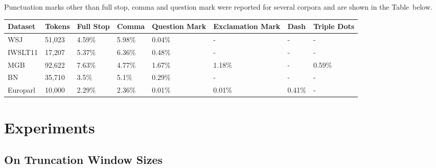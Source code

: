 \documentclass[bsc,deptreport,ai]{infthesis} %
\begin{document}
Punctuation marks other than full stop, comma and question mark were reported for several corpora and are shown in the Table~below.
\\
\vspace{1cm}
\begin{adjustbox}{width=\columnwidth,center}
\begin{tabular}{|l|lllllll|}
\hline
\textbf{Dataset} & \textbf{Tokens} & \textbf{Full Stop} & \textbf{Comma} & \textbf{Question Mark} & \textbf{Exclamation Mark} & \textbf{Dash} & \textbf{Triple Dots} \\ \hline
WSJ              & 51,023          & 4.59\%             & 5.98\%         & 0.04\%                 & -                         & -             & -                    \\
IWSLT11              & 17,207          & 5.37\%             & 6.36\%         & 0.48\%                 & -                         & -             & -                    \\
MGB              & 92,622          & 7.63\%             & 4.77\%         & 1.67\%                 & 1.18\%                    & -             & 0.59\%               \\
BN               & 35,710          & 3.5\%              & 5.1\%          & 0.29\%                 & -                         & -             & -                    \\
Europarl         & 10,000          & 2.29\%             & 2.36\%         & 0.01\%                 & 0.01\%                    & 0.41\%        & -                    \\ \hline
\end{tabular}
\end{adjustbox}

\chapter{Experiments}
\section{On Truncation Window Sizes}
\end{document}
